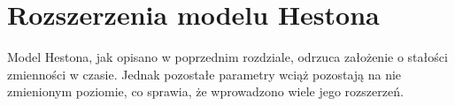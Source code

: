 \documentclass{pracamgr}
\begin{document}
\chapter{Rozszerzenia modelu Hestona}

Model Hestona, jak opisano w poprzednim rozdziale, odrzuca założenie o stałości zmienności w czasie. Jednak pozostałe parametry wciąż pozostają na nie zmienionym poziomie, 
co sprawia, że wprowadzono wiele jego rozszerzeń. 









\end{document}
